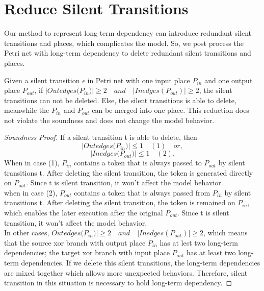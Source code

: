 \section{Reduce Silent Transitions}
Our method to represent long-term dependency can introduce redundant silent transitions and places, which complicates the model. So, we post process the Petri net with long-term dependency to delete redundant silent transitions and places.
\begin{proposition}
	Given a silent transition $\epsilon$ in Petri net with one input place $P_{in}$ and one output place $P_{out}$, if $\vert Outedges({P_{in}) }\vert \geq 2 \quad and \quad \vert Inedges(P_{out}) \vert \geq 2 $, the silent transitions can not be deleted. Else, the silent transitions is able to delete, meanwhile the $P_{in}$ and $P_{out}$ can be merged into one place. This reduction does not violate the soundness and does not change the model behavior.
\end{proposition}
\begin{proof}[Soundness Proof]
	If a silent transition t is able to delete, then
	\[\vert Outedges({P_{in}) }\vert \leq 1	\quad (1) \quad or, \]
	\[\vert Inedges({P_{out}) }\vert \leq 1\quad (2).\]
	When in case (1), $P_{in}$ contains a token that is always passed to $P_{out}$ by silent transitions t. After deleting the silent transition, the token is generated directly on $P_{out}$. Since t is silent transition, it won't affect the model behavior. \\ 
	when in case (2), $P_{out}$ contains a token that is always passed from $P_{in}$ by silent transitions t. After deleting the silent transition, the token is remained on $P_{in}$, which enables the later execution after the original $P_{out}$. Since t is silent transition, it won't affect the model behavior. \\
	In other cases, $Outedges({P_{in}) }\vert \geq 2 \quad and \quad \vert Inedges(P_{out}) \vert \geq 2$, which means that the source xor branch with output place $P_{in}$ has at lest two long-term dependencies; the target xor branch with input place $P_{out}$ has at least two long-term dependencies. If we delete this silent transitions, the long-term dependencies are mixed together which allows more unexpected behaviors. Therefore, silent transition in this situation is necessary to hold long-term dependency.
\end{proof}
